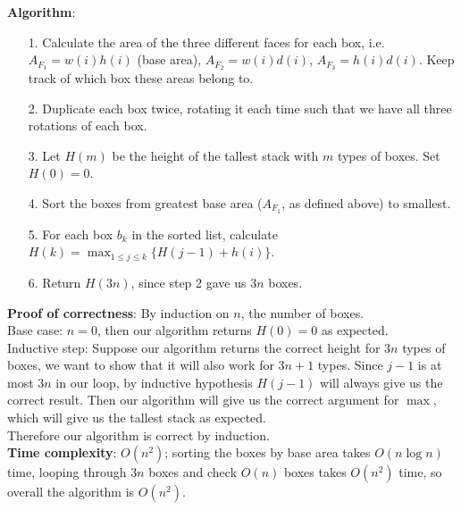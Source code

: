 \documentclass{article}
\begin{document}
\begin{itemize}
          \textbf{Algorithm}:
          \begin{itemize}
              \item [1.] Calculate the area of the three different faces for each box, i.e. $A_{F_1}=w(i)h(i)$ (base area), $A_{F_2}=w(i)d(i)$, $A_{F_3}=h(i)d(i)$. Keep track of which box these areas belong to.
              \item [2.] Duplicate each box twice, rotating it each time such that we have all three rotations of each box.
              \item [3.] Let $H(m)$ be the height of the tallest stack with $m$ types of boxes. Set $H(0)=0$.
              \item [4.] Sort the boxes from greatest base area ($A_{F_1}$, as defined above) to smallest.
              \item [5.] For each box $b_k$ in the sorted list, calculate $H(k)=\max_{1\leq j\leq k}\{H(j-1)+h(i)\}$.
              \item [6.] Return $H(3n)$, since step 2 gave us $3n$ boxes.
          \end{itemize}
          \textbf{Proof of correctness}: By induction on $n$, the number of boxes.\\
          Base case: $n=0$, then our algorithm returns $H(0)=0$ as expected.\\
          Inductive step: Suppose our algorithm returns the correct height for $3n$ types of boxes, we want to show that it will also work for $3n+1$ types. Since $j-1$ is at most $3n$ in our loop, by inductive hypothesis $H(j-1)$ will always give us the correct result. Then our algorithm will give us the correct argument for $\max$, which will give us the tallest stack as expected.\\
          Therefore our algorithm is correct by induction.\\
          \textbf{Time complexity}: $O(n^2)$; sorting the boxes by base area takes $O(n\log n)$ time, looping through $3n$ boxes and check $O(n)$ boxes takes $O(n^2)$ time, so overall the algorithm is $O(n^2)$.
\end{itemize}
\end{document}
